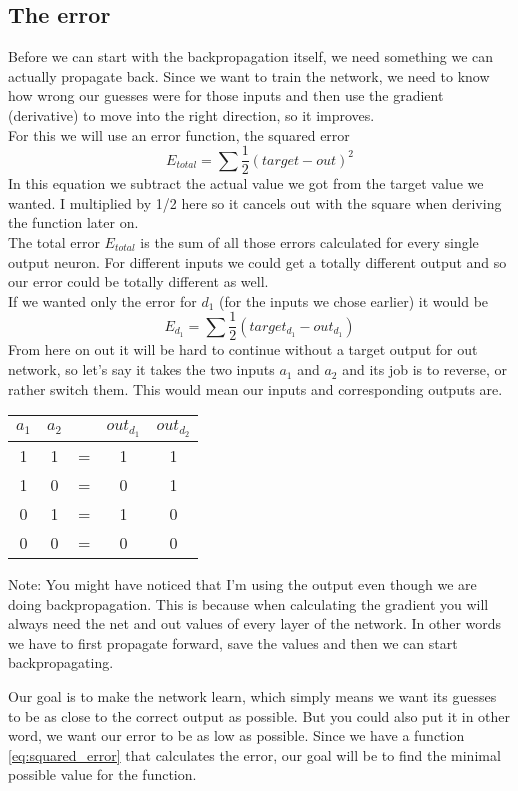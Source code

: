 \documentclass[11pt, halfparskip]{article}
\begin{document}
     \subsection{The error}
     \label{sec:the:error}
     Before we can start with the backpropagation itself, we need something we can actually propagate back. Since we want to train the network, we need to know how wrong our
     guesses were for those inputs and then use the gradient (derivative) to move into the right direction, so it improves.\\
     For this we will use an error function, the squared error 
     \begin{equation} 
     \label{eq:squared_error}
     	E_{total} = \sum \frac{1}{2}(target - out)^2
    \end{equation}
    In this equation we subtract the actual value we got from the target value we wanted. I multiplied by 1/2 here so it cancels out with the square when deriving the function later on.\\
    The total error $E_{total}$ is the sum of all those errors calculated for every single output neuron. For different inputs we could get a totally different output and so our error could 
    be totally different as well. \\
    If we wanted only the error for $d_1$ (for the inputs we chose earlier) it would be 
    \[
    	E_{d_1} = \sum \frac{1}{2}(target_{d_1} - out_{d_1})
    \]
    From here on out it will be hard to continue without a target output for out network, so let's say it takes the two inputs $a_1$ and $a_2$ and its job is to reverse, or rather switch
    them. This would mean our inputs and corresponding outputs are.
    \begin{center}
	    \begin{tabular}{c c c c c}
	    	$a_1$ & $a_2$ &  & $out_{d_1}$ & $out_{d_2}$\\
    		\hline
	    	1 & 1 & = & 1 & 1\\
    		1 & 0 & = & 0 & 1\\
	    	0 & 1 & = & 1 & 0\\
    		0 & 0 & = & 0 & 0
    	\end{tabular}
    \end{center}
    
    \noindent \newline
    \begin{tiny}
    Note: You might have noticed that I'm using the output even though we are doing backpropagation. This is because when calculating the gradient you will always need the net and out
    values of every layer of the network. In other words we have to first propagate forward, save the values and then we can start backpropagating.\\
    \end{tiny}
    Our goal is to make the network learn, which simply means we want its guesses to be as close to the correct output as possible. But you could also put it in other word, we want our
    error to be as low as possible. Since we have a function \ref{eq:squared_error} that calculates the error, our goal will be to find the minimal possible value for the function.\\
    
\end{document}
